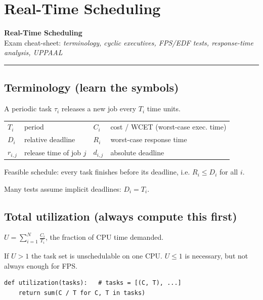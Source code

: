 \chapter{Real-Time Scheduling}


\begin{center}
{\Large\bfseries Real-Time Scheduling}\\[1pt]
{\small Exam cheat-sheet: \emph{terminology, cyclic executives, FPS/EDF tests, response-time analysis, UPPAAL}}
\end{center}
\hrule
\vspace{4pt}

\section{Terminology (learn the symbols)}
A periodic task $\tau_i$ releases a new job every $T_i$ time units.
\begin{center}\small
\begin{tabular}{@{}llll@{}}
\toprule
$T_i$ & period & $C_i$ & cost / WCET (worst-case exec. time)\\
$D_i$ & relative deadline & $R_i$ & worst-case response time\\
$r_{i,j}$ & release time of job $j$ & $d_{i,j}$ & absolute deadline\\
\bottomrule
\end{tabular}
\end{center}
\begin{keybox}
Feasible schedule: every task finishes before its deadline, i.e. $R_i\le D_i$ for all $i$.
\end{keybox}
Many tests assume implicit deadlines: $D_i=T_i$.

\section{Total utilization (always compute this first)}
\begin{keybox}
$U=\displaystyle\sum_{i=1}^{N}\frac{C_i}{T_i}$, the fraction of CPU time demanded.
\end{keybox}
If $U>1$ the task set is unschedulable on one CPU. $U\le 1$ is necessary, but not always enough for FPS.

\begin{lstlisting}
def utilization(tasks):   # tasks = [(C, T), ...]
    return sum(C / T for C, T in tasks)
\end{lstlisting}


